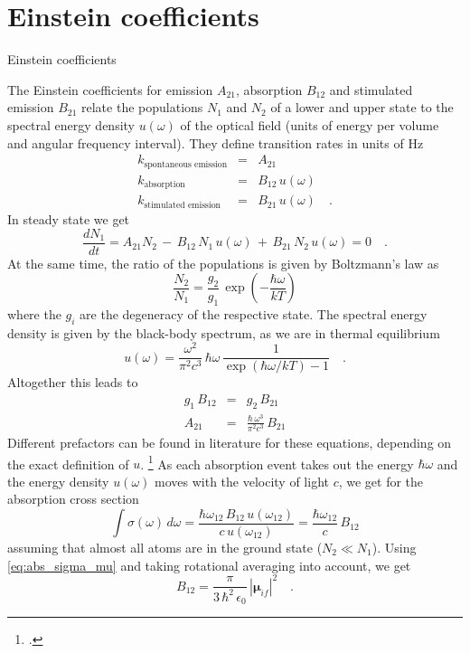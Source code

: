 \section{Einstein coefficients}

\begin{marginfigure}
  \caption{Einstein coefficients}
\end{marginfigure}


The Einstein coefficients for emission $A_{21}$, absorption $B_{12}$ and stimulated emission $B_{21}$ relate the populations $N_1$ and $N_2$ of a lower and upper state to the spectral energy density $u(\omega)$ of the optical field (units of energy per volume and angular frequency interval). They define transition rates in units of Hz
\begin{eqnarray}
 k_{\text{spontaneous emission}} &=& A_{21} \\
  k_{\text{absorption}}  & = & B_{12} \,   u(\omega) \\
  k_{\text{stimulated emission }} & =&  B_{21} \,  u(\omega)  \quad .
\end{eqnarray}
%
In steady state we get
\begin{equation}
 \frac{d N_1}{dt} =  A_{21} N_2 \, - \, B_{12} \, N_1 \, u(\omega) \, + \, B_{21}\, N_2 \,u(\omega)  = 0 \quad .
\end{equation}
At the same time, the ratio of the populations is given by Boltzmann's law as
\begin{equation}
 \frac{N_2}{N_1} = \frac{g_2}{g_1} \, \exp \left( - \frac{\hbar \omega}{kT} \right)
\end{equation}
where the $g_i$ are the degeneracy of the respective state. The spectral energy density is given by the black-body spectrum, as we are in thermal equilibrium
\begin{equation}
 u(\omega) = \frac{\omega^2}{\pi^2 c^3} \, \hbar \omega \, \frac{1}{\exp \left( \hbar \omega / kT \right) - 1} \quad .
\end{equation}
Altogether this leads to 
\begin{eqnarray}
 g_1 \, B_{12} &=& g_2 \, B_{21} \\
 A_{21} &=&  \frac{\hbar \, \omega^3}{\pi^2 c^3} \, B_{21}  \label{eq:fl_Einstein_A_B}
\end{eqnarray}
Different prefactors can be found in literature for these equations, depending on the exact definition of $u$.
 \footcite{Hilborn:2002wj} 
 As each absorption event takes out the energy $\hbar \omega$ and the energy density $u(\omega)$ moves with the velocity of light $c$, we get for the absorption cross section
\begin{equation}
\int \sigma(\omega) \, d \omega = \frac{\hbar \omega_{12} \, B_{12} \, u(\omega_{12})  }{c \, u(\omega_{12}) }  =
   \frac{\hbar \omega_{12}  }{c  }    \, B_{12}
\end{equation}
assuming that almost all atoms are in the ground state ($N_2 \ll N_1$). Using \ref{eq:abs_sigma_mu} and taking rotational averaging into account, we get
\begin{equation}
B_{12} = \frac{\pi}{3 \, \hbar^2 \, \epsilon_0} \,  |\mathbf{\mu}_{if} |^2  \quad . \label{eq:fl_B_from_mu}
\end{equation}

